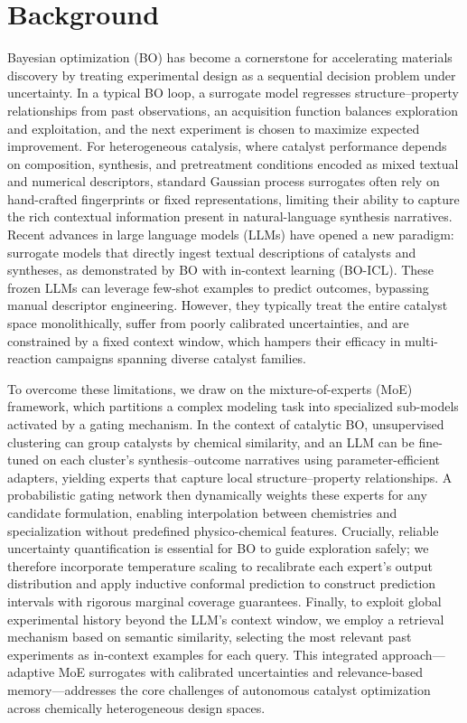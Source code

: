 \documentclass{article}
\begin{document}
\section{Background}
Bayesian optimization (BO) has become a cornerstone for accelerating materials discovery by treating experimental design as a sequential decision problem under uncertainty. In a typical BO loop, a surrogate model regresses structure--property relationships from past observations, an acquisition function balances exploration and exploitation, and the next experiment is chosen to maximize expected improvement. For heterogeneous catalysis, where catalyst performance depends on composition, synthesis, and pretreatment conditions encoded as mixed textual and numerical descriptors, standard Gaussian process surrogates often rely on hand-crafted fingerprints or fixed representations, limiting their ability to capture the rich contextual information present in natural-language synthesis narratives. Recent advances in large language models (LLMs) have opened a new paradigm: surrogate models that directly ingest textual descriptions of catalysts and syntheses, as demonstrated by BO with in-context learning (BO-ICL). These frozen LLMs can leverage few-shot examples to predict outcomes, bypassing manual descriptor engineering. However, they typically treat the entire catalyst space monolithically, suffer from poorly calibrated uncertainties, and are constrained by a fixed context window, which hampers their efficacy in multi-reaction campaigns spanning diverse catalyst families.

To overcome these limitations, we draw on the mixture-of-experts (MoE) framework, which partitions a complex modeling task into specialized sub-models activated by a gating mechanism. In the context of catalytic BO, unsupervised clustering can group catalysts by chemical similarity, and an LLM can be fine-tuned on each cluster’s synthesis--outcome narratives using parameter-efficient adapters, yielding experts that capture local structure--property relationships. A probabilistic gating network then dynamically weights these experts for any candidate formulation, enabling interpolation between chemistries and specialization without predefined physico-chemical features. Crucially, reliable uncertainty quantification is essential for BO to guide exploration safely; we therefore incorporate temperature scaling to recalibrate each expert’s output distribution and apply inductive conformal prediction to construct prediction intervals with rigorous marginal coverage guarantees. Finally, to exploit global experimental history beyond the LLM’s context window, we employ a retrieval mechanism based on semantic similarity, selecting the most relevant past experiments as in-context examples for each query. This integrated approach—adaptive MoE surrogates with calibrated uncertainties and relevance-based memory—addresses the core challenges of autonomous catalyst optimization across chemically heterogeneous design spaces.
\end{document}

